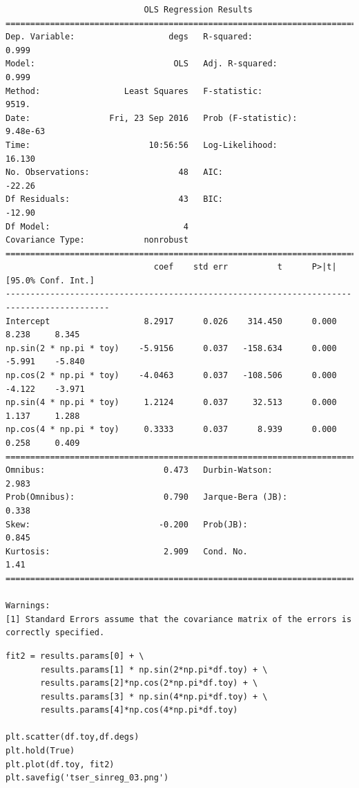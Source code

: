 \documentclass[12pt,fleqn]{article}\usepackage{../../common}
\begin{document}
\begin{verbatim}
                            OLS Regression Results                            
==============================================================================
Dep. Variable:                   degs   R-squared:                       0.999
Model:                            OLS   Adj. R-squared:                  0.999
Method:                 Least Squares   F-statistic:                     9519.
Date:                Fri, 23 Sep 2016   Prob (F-statistic):           9.48e-63
Time:                        10:56:56   Log-Likelihood:                 16.130
No. Observations:                  48   AIC:                            -22.26
Df Residuals:                      43   BIC:                            -12.90
Df Model:                           4                                         
Covariance Type:            nonrobust                                         
===========================================================================================
                              coef    std err          t      P>|t|      [95.0% Conf. Int.]
-------------------------------------------------------------------------------------------
Intercept                   8.2917      0.026    314.450      0.000         8.238     8.345
np.sin(2 * np.pi * toy)    -5.9156      0.037   -158.634      0.000        -5.991    -5.840
np.cos(2 * np.pi * toy)    -4.0463      0.037   -108.506      0.000        -4.122    -3.971
np.sin(4 * np.pi * toy)     1.2124      0.037     32.513      0.000         1.137     1.288
np.cos(4 * np.pi * toy)     0.3333      0.037      8.939      0.000         0.258     0.409
==============================================================================
Omnibus:                        0.473   Durbin-Watson:                   2.983
Prob(Omnibus):                  0.790   Jarque-Bera (JB):                0.338
Skew:                          -0.200   Prob(JB):                        0.845
Kurtosis:                       2.909   Cond. No.                         1.41
==============================================================================

Warnings:
[1] Standard Errors assume that the covariance matrix of the errors is correctly specified.
\end{verbatim}

\begin{verbatim}
fit2 = results.params[0] + \
       results.params[1] * np.sin(2*np.pi*df.toy) + \
       results.params[2]*np.cos(2*np.pi*df.toy) + \
       results.params[3] * np.sin(4*np.pi*df.toy) + \
       results.params[4]*np.cos(4*np.pi*df.toy) 
      
plt.scatter(df.toy,df.degs)
plt.hold(True)
plt.plot(df.toy, fit2)
plt.savefig('tser_sinreg_03.png')
\end{verbatim}
\end{document}
